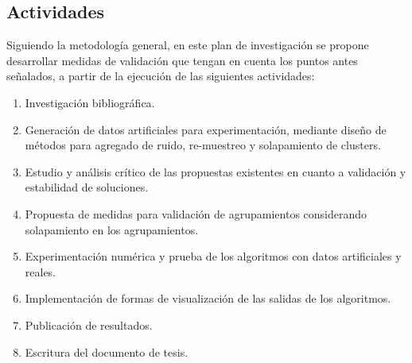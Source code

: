 \documentclass[a4paper,8pt]{article}
\begin{document}
\subsection{Actividades}
\label{actividades}
Siguiendo la metodología general, 
en este plan de investigación se propone desarrollar medidas de validación que tengan en cuenta los puntos antes señalados, a partir de la ejecución de las siguientes actividades:
\begin{enumerate}
	\item Investigación bibliográfica.
	\item Generación de datos artificiales para experimentación, mediante diseño de métodos para 
agregado de ruido, re-muestreo y solapamiento de clusters.
	\item Estudio y análisis crítico de las propuestas existentes en cuanto a validación y estabilidad de soluciones.
	\item Propuesta de medidas para validación de agrupamientos considerando solapamiento en los agrupamientos.
	\item Experimentación numérica y prueba de los algoritmos con datos artificiales y reales.
	\item Implementación de formas de visualización de las salidas de los algoritmos.
	\item Publicación de resultados.
	\item Escritura del documento de tesis.
\end{enumerate}

\end{document}
